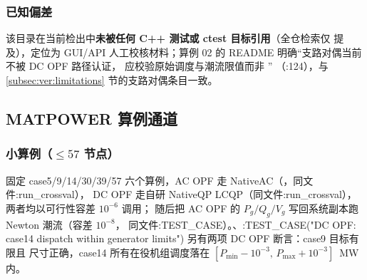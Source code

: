 \subsubsection*{已知偏差}
该目录在当前检出中\textbf{未被任何 C++ 测试或 ctest 目标引用}（全仓检索仅
 提及），定位为
GUI/API 人工校核材料；算例 02 的 README 明确“支路对偶当前不被 DC OPF 路径认证，
应校验原始调度与潮流限值而非 ”
（:124），与
\ref{subsec:ver:limitations} 节的支路对偶条目一致。

\subsection{MATPOWER 算例通道}\label{subsec:ver:matpower}

\subsubsection*{小算例（$\le 57$ 节点）}
 固定 case5/9/14/30/39/57
六个算例，AC OPF 走 NativeAC（，同文件:run\_crossval），
DC OPF 走自研 NativeQP LCQP（同文件:run\_crossval），两者均以可行性容差 $10^{-6}$ 调用；
随后把 AC OPF 的 $P_g/Q_g/V_g$ 写回系统副本跑 Newton 潮流（容差 $10^{-8}$，
同文件:TEST\_CASE）。、:TEST\_CASE("DC OPF: case14 dispatch within generator limits") 另有两项
DC OPF 断言：case9 目标有限且  尺寸正确，case14 所有在役机组调度落在
$[P_{\min}-10^{-3},\,P_{\max}+10^{-3}]$~MW 内。


